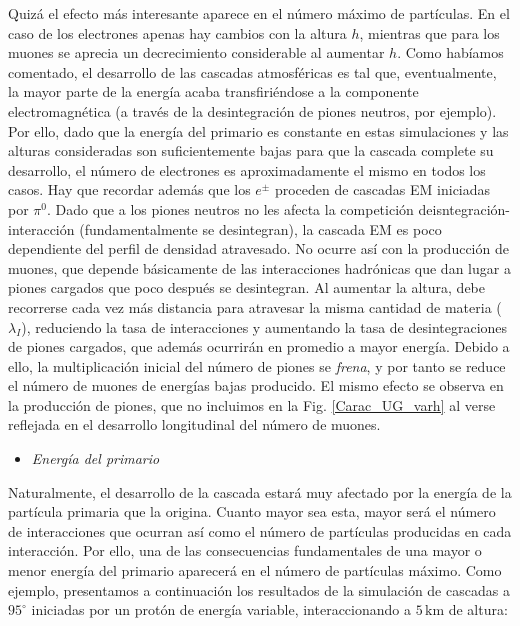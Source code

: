 \documentclass[11 pt, a4paper]{article} %
\numberwithin{equation}{section}
\numberwithin{figure}{section}
\numberwithin{table}{section}
\begin{document}
Quizá el efecto más interesante aparece en el número máximo de partículas. En el caso de los electrones apenas hay cambios con la altura $h$, mientras que para los muones se aprecia un decrecimiento considerable al aumentar $h$. Como habíamos comentado, el desarrollo de las cascadas atmosféricas es tal que, eventualmente, la mayor parte de la energía acaba transfiriéndose a la componente electromagnética (a través de la desintegración de piones neutros, por ejemplo). Por ello, dado que la energía del primario es constante en estas simulaciones y las alturas consideradas son suficientemente bajas para que la cascada complete su desarrollo, el número de electrones es aproximadamente el mismo en todos los casos. Hay que recordar además que los $e^\pm$ proceden de cascadas EM iniciadas por $\pi^0$. Dado que a los piones neutros no les afecta la competición deisntegración-interacción (fundamentalmente se desintegran), la cascada EM es poco dependiente del perfil de densidad atravesado. No ocurre así con la producción de muones, que depende básicamente de las interacciones hadrónicas que dan lugar a piones cargados que poco después se desintegran. Al aumentar la altura, debe recorrerse cada vez más distancia para atravesar la misma cantidad de materia ($\lambda_I$), reduciendo la tasa de interacciones y aumentando la tasa de desintegraciones de piones cargados, que además ocurrirán en promedio a mayor energía. Debido a ello, la multiplicación inicial del número de piones se \textit{frena}, y por tanto se reduce el número de muones de energías bajas producido. El mismo efecto se observa en la producción de piones, que no incluimos en la Fig. \ref{Carac_UG_varh} al verse reflejada en el desarrollo longitudinal del número de muones.
\begin{itemize}
	\item \textit{Energía del primario}
\end{itemize}
Naturalmente, el desarrollo de la cascada estará muy afectado por la energía de la partícula primaria que la origina. Cuanto mayor sea esta, mayor será el número de interacciones que ocurran así como el número de partículas producidas en cada interacción. Por ello, una de las consecuencias fundamentales de una mayor o menor energía del primario aparecerá en el número de partículas máximo. Como ejemplo, presentamos a continuación los resultados de la simulación de cascadas a $95^\circ$ iniciadas por un protón de energía variable, interaccionando a $5\,\mathrm{km}$ de altura: 
\end{document}
